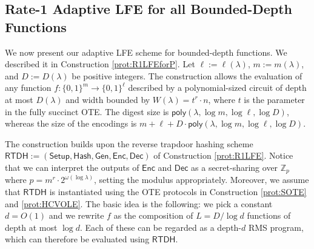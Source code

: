 \documentclass{article}
\newcommand{\Z}{\mathbb{Z}}
\newcommand{\poly}{\mathsf{poly}}
\renewcommand{\sec}{\ensuremath{\lambda}}
\newcommand{\RTDH}{\mathsf{RTDH}}
\newcommand{\algofont}[1]{\ensuremath{\mathsf{#1}}}
\newcommand{\Enc}{{\algofont{Enc}}}
\newcommand{\Dec}{{\algofont{Dec}}}
\newcommand{\Setup}{{\algofont{Setup}}}
\newcommand{\Gen}{{\algofont{Gen}}}
\newcommand{\Hash}{{\algofont{Hash}}}
\begin{document}
\subsection{Rate-1 Adaptive LFE for all Bounded-Depth Functions}\label{sec:mainLFE}

We now present our adaptive LFE scheme for bounded-depth functions. We described it in Construction \ref{prot:R1LFEforP}. Let $\ell:=\ell(\sec)$, $m:=m(\sec)$,  and $D:=D(\sec)$ be positive integers. The construction allows the evaluation of any function $f:\{0, 1\}^m\rightarrow \{0, 1\}^\ell$ described by a polynomial-sized circuit of depth at most $D(\sec)$ and width bounded by $W(\sec)=t^r\cdot n$, where $t$ is the parameter in the fully succinct OTE. The digest size is $\poly(\sec, \log m, \log \ell, \log D)$, whereas the size of the encodings is $m+\ell+D\cdot \poly(\sec, \log m, \log \ell, \log D)$.


The construction builds upon the reverse trapdoor hashing scheme $\RTDH:=(\Setup, \allowbreak\Hash, \allowbreak\Gen, \Enc, \Dec)$ of Construction \ref{prot:R1LFE}. {Notice that we can interpret the outputs of $\Enc$ and $\Dec$ as a secret-sharing over $\Z_p$ where $p=m^r\cdot 2^{\omega(\log \sec)}$, setting the modulus appropriately.} Moreover, we assume that $\RTDH$ is instantiated using the OTE protocols in Construction \ref{prot:SOTE} and \ref{prot:HCVOLE}. The  basic idea is the following: we pick a constant $d=O(1)$ and we rewrite $f$ as the composition of $L=D/\log d$ functions of depth at most $\log d$. Each of these can be regarded as a depth-$d$ RMS program, which can therefore be evaluated using $\RTDH$.
\end{document}
